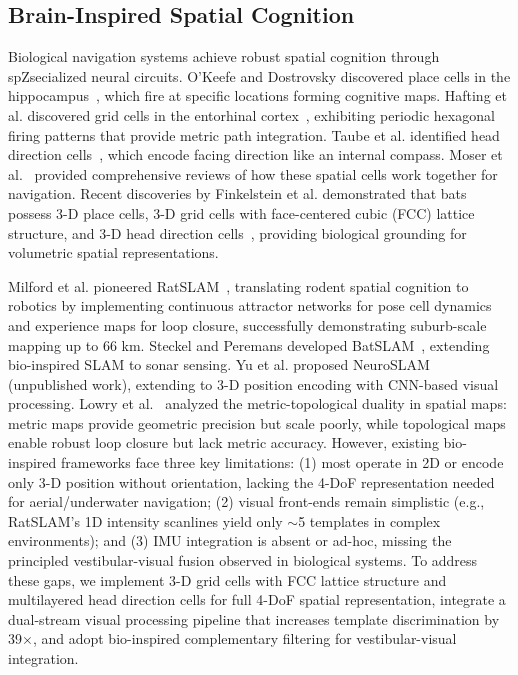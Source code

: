 \subsection{Brain-Inspired Spatial Cognition}
\label{sec:related_bio}

Biological navigation systems achieve robust spatial cognition through spZsecialized neural circuits. O'Keefe and Dostrovsky discovered place cells in the hippocampus~\cite{OKeefe1971}, which fire at specific locations forming cognitive maps. Hafting et al. discovered grid cells in the entorhinal cortex~\cite{Hafting2005}, exhibiting periodic hexagonal firing patterns that provide metric path integration. Taube et al. identified head direction cells~\cite{Taube1990}, which encode facing direction like an internal compass. Moser et al.~\cite{Moser2017} provided comprehensive reviews of how these spatial cells work together for navigation. Recent discoveries by Finkelstein et al. demonstrated that bats possess 3-D place cells, 3-D grid cells with face-centered cubic (FCC) lattice structure, and 3-D head direction cells~\cite{finkelstein2015three, finkelstein2016three}, providing biological grounding for volumetric spatial representations.

Milford et al. pioneered RatSLAM~\cite{milford2004ratslam, milford2008mapping}, translating rodent spatial cognition to robotics by implementing continuous attractor networks for pose cell dynamics and experience maps for loop closure, successfully demonstrating suburb-scale mapping up to 66 km. Steckel and Peremans developed BatSLAM~\cite{steckel2013batslam}, extending bio-inspired SLAM to sonar sensing. Yu et al. proposed NeuroSLAM (unpublished work), extending to 3-D position encoding with CNN-based visual processing. Lowry et al.~\cite{Lowry2016} analyzed the metric-topological duality in spatial maps: metric maps provide geometric precision but scale poorly, while topological maps enable robust loop closure but lack metric accuracy. However, existing bio-inspired frameworks face three key limitations: (1) most operate in 2D or encode only 3-D position without orientation, lacking the 4-DoF representation needed for aerial/underwater navigation; (2) visual front-ends remain simplistic (e.g., RatSLAM's 1D intensity scanlines yield only $\sim$5 templates in complex environments); and (3) IMU integration is absent or ad-hoc, missing the principled vestibular-visual fusion observed in biological systems. To address these gaps, we implement 3-D grid cells with FCC lattice structure and multilayered head direction cells for full 4-DoF spatial representation, integrate a dual-stream visual processing pipeline that increases template discrimination by 39$\times$, and adopt bio-inspired complementary filtering for vestibular-visual integration.

